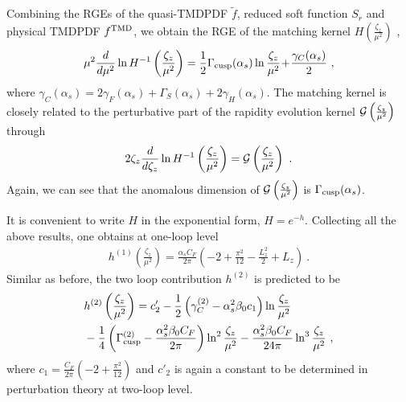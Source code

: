 Combining the RGEs of the quasi-TMDPDF $\tilde f$, reduced soft function $S_r$ and physical TMDPDF $f^{\rm TMD}$, we obtain the RGE of the matching kernel $H\left(\frac{\zeta_z}{\mu^2}\right)$ \cite{Ji:2019ewn},
\begin{align}
	\mu^2 \frac{d}{d\mu^2} \ln H^{-1}\left(\frac{\zeta_z}{\mu^2}\right)=\frac{1}{2}\Gamma_{\rm cusp}(\alpha_s)  \ln\frac{\zeta_z}{\mu^2}\!+\!\frac{\gamma_C(\alpha_s)}{2}  \ ,
\end{align}
where $\gamma_C(\alpha_s)=2\gamma_F(\alpha_s)+\Gamma_S(\alpha_s)+2\gamma_H(\alpha_s)$. The matching kernel is closely related to the perturbative part of the rapidity evolution kernel ${\cal G}\left(\frac{\zeta_z}{\mu^2}\right)$ through
\begin{align}
	2\zeta_z\frac{d}{d\zeta_z}\ln H^{-1}\left(\frac{\zeta_z}{\mu^2}\right)={\cal G}\left(\frac{\zeta_z}{\mu^2}\right) \ .
\end{align}
Again, we can see that the anomalous dimension of ${\cal G}\left(\frac{\zeta_z}{\mu^2}\right)$ is $\Gamma_{\rm cusp}(\alpha_s)$.

It is convenient to write $H$ in the exponential form, $H=e^{-h}$. Collecting all the above results, one obtains at one-loop level~\cite{Ji:2018hvs,Ebert:2019okf}
\begin{align}
	h^{(1)}\left(\frac{\zeta_z}{\mu^2}
	\right)=\frac{\alpha_sC_F}{2\pi}\left(-2+\frac{\pi^2}{12}-\frac{L_z^2}{2}+L_z\right) \ .
\end{align}
Similar as before, the two loop contribution $h^{(2)}$ is predicted to be
\begin{align}
	&h^{(2)}\left(\frac{\zeta_z}{\mu^2}\right)=c'_2-\frac{1}{2}\left(\gamma^{(2)}_C-\alpha_s^2\beta_0 c_1\right)\ln\frac{\zeta_z}{\mu^2}\\
	&-\frac{1}{4}\left(\Gamma^{(2)}_{\rm cusp}-\frac{\alpha_s^2\beta_0 C_F}{2\pi}\right)\ln^2\frac{\zeta_z}{\mu^2}-\frac{\alpha_s^2\beta_0C_F}{24\pi}\ln^3\frac{\zeta_z}{\mu^2} \ ,\nonumber
\end{align}
where $c_1=\frac{C_F}{2\pi}\left(-2+\frac{\pi^2}{12}\right)$ and $c'_2$ is again a constant to be determined in perturbation theory at two-loop level.

